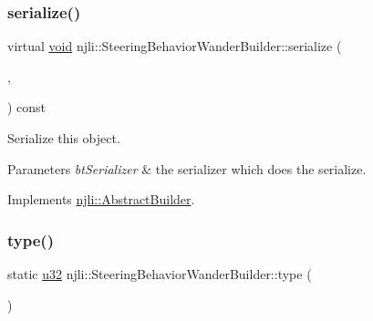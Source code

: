 \mbox{\label{classnjli_1_1_steering_behavior_wander_builder_ae0ffb4d9dc1e7d4aea3113ec3cf5df4c}} 
\subsubsection{\texorpdfstring{serialize()}{serialize()}}
{\footnotesize\ttfamily virtual \mbox{\hyperlink{_thread_8h_af1e856da2e658414cb2456cb6f7ebc66}{void}} njli\+::\+Steering\+Behavior\+Wander\+Builder\+::serialize (\begin{DoxyParamCaption}\item[{\mbox{\hyperlink{_thread_8h_af1e856da2e658414cb2456cb6f7ebc66}{void}} $\ast$}]{,  }\item[{bt\+Serializer $\ast$}]{ }\end{DoxyParamCaption}) const\hspace{0.3cm}{\ttfamily [virtual]}}

Serialize this object.


\begin{DoxyParams}{Parameters}
{\em bt\+Serializer} & the serializer which does the serialize. \\
\hline
\end{DoxyParams}


Implements \mbox{\hyperlink{classnjli_1_1_abstract_builder_ab66b774e02ccb9da554c9aab7fa6d981}{njli\+::\+Abstract\+Builder}}.

\mbox{\label{classnjli_1_1_steering_behavior_wander_builder_ad033c4651eb9c3a2969a73b4970e139e}} 
\subsubsection{\texorpdfstring{type()}{type()}}
{\footnotesize\ttfamily static \mbox{\hyperlink{_util_8h_a10e94b422ef0c20dcdec20d31a1f5049}{u32}} njli\+::\+Steering\+Behavior\+Wander\+Builder\+::type (\begin{DoxyParamCaption}{ }\end{DoxyParamCaption})\hspace{0.3cm}{\ttfamily [static]}}

